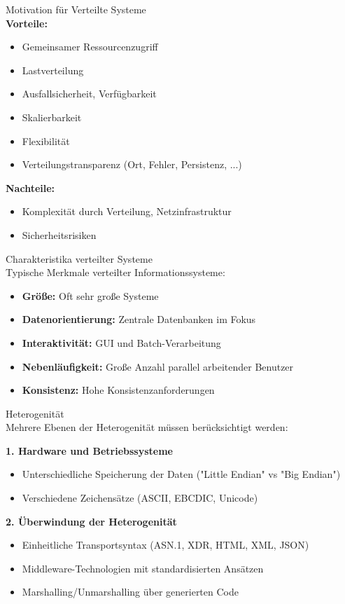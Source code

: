 \begin{concept}{Motivation für Verteilte Systeme}\\
\textbf{Vorteile:}
\begin{itemize}
    \item Gemeinsamer Ressourcenzugriff
    \item Lastverteilung
    \item Ausfallsicherheit, Verfügbarkeit  
    \item Skalierbarkeit
    \item Flexibilität
    \item Verteilungstransparenz (Ort, Fehler, Persistenz, ...)
\end{itemize}

\textbf{Nachteile:}
\begin{itemize}
    \item Komplexität durch Verteilung, Netzinfrastruktur
    \item Sicherheitsrisiken
\end{itemize}
\end{concept}

\begin{concept}{Charakteristika verteilter Systeme}\\
Typische Merkmale verteilter Informationssysteme:
\begin{itemize}
    \item \textbf{Größe:} Oft sehr große Systeme
    \item \textbf{Datenorientierung:} Zentrale Datenbanken im Fokus
    \item \textbf{Interaktivität:} GUI und Batch-Verarbeitung
    \item \textbf{Nebenläufigkeit:} Große Anzahl parallel arbeitender Benutzer
    \item \textbf{Konsistenz:} Hohe Konsistenzanforderungen
\end{itemize}
\end{concept}

\begin{concept}{Heterogenität}\\
Mehrere Ebenen der Heterogenität müssen berücksichtigt werden:

\textbf{1. Hardware und Betriebssysteme}
\begin{itemize}
    \item Unterschiedliche Speicherung der Daten ("Little Endian" vs "Big Endian")
    \item Verschiedene Zeichensätze (ASCII, EBCDIC, Unicode)
\end{itemize}

\textbf{2. Überwindung der Heterogenität}
\begin{itemize}
    \item Einheitliche Transportsyntax (ASN.1, XDR, HTML, XML, JSON)
    \item Middleware-Technologien mit standardisierten Ansätzen
    \item Marshalling/Unmarshalling über generierten Code
\end{itemize}
\end{concept}

